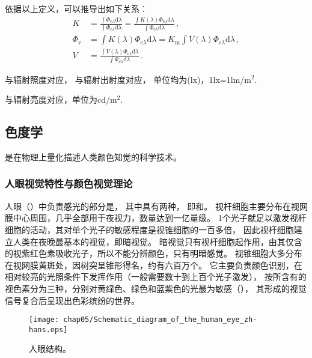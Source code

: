 依据以上定义，可以推导出如下关系：
\begin{align}
      K                    & =\frac{\displaystyle\int \varPhi_{\mathrm{v}\lambda}\mathrm{d}\lambda}{\displaystyle\int \varPhi_{\mathrm{e}\lambda}\mathrm{d}\lambda}=\frac{\displaystyle\int K(\lambda)\varPhi_{\mathrm{e}\lambda}\mathrm{d}\lambda}{\displaystyle\int \varPhi_{\mathrm{e}\lambda}\mathrm{d}\lambda}\, , \\
      \varPhi_{\mathrm{v}} & =\displaystyle\int K(\lambda)\varPhi_{\mathrm{e}\lambda}\mathrm{d}\lambda=K_{\mathrm{m}}\int V(\lambda)\varPhi_{\mathrm{e}\lambda}\mathrm{d}\lambda\, ,                                                                                                                                    \\
      V                    & =\frac{\displaystyle\int V(\lambda)\varPhi_{\mathrm{e}\lambda}\mathrm{d}\lambda}{\displaystyle\int \varPhi_{\mathrm{e}\lambda}\mathrm{d}\lambda}\, .
\end{align}

与辐射照度对应，
与辐射出射度对应，
单位均为(lx)，1lx=1lm$/$m$^2$.

与辐射亮度对应，单位为cd$/$m$^2$.

\subsection{色度学}\label{sub:色度学}
是在物理上量化描述人类颜色知觉的科学技术。
\subsubsection*{人眼视觉特性与颜色视觉理论}
人眼（）中负责感光的部分是，
其中具有两种，
即和。
视杆细胞主要分布在视网膜中心周围，几乎全部用于夜视力，数量达到一亿量级。
1个光子就足以激发视杆细胞的活动，其对单个光子的敏感程度是视锥细胞的一百多倍，
因此视杆细胞建立人类在夜晚最基本的视觉，即暗视觉。
暗视觉只有视杆细胞起作用，由其仅含的视紫红色素吸收光子，所以不能分辨颜色，只有明暗感觉。
视锥细胞大多分布在视网膜黄斑处，因树突呈锥形得名，约有六百万个。
它主要负责颜色识别，在相对较亮的光照条件下发挥作用（一般需要数十到上百个光子激发），
按所含有的视色素分为三种，分别对黄绿色、绿色和蓝紫色的光最为敏感（），
其形成的视觉信号复合后呈现出色彩缤纷的世界。
\begin{figure}[htbp]
      \centering\texttt{[image: chap05/Schematic\_diagram\_of\_the\_human\_eye\_zh-hans.eps]}
      \caption{人眼结构。}
      \label{fig:5.ex04}
\end{figure}

